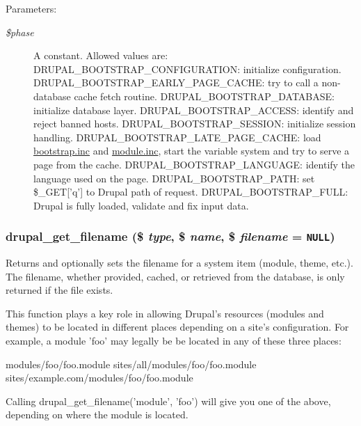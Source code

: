 \begin{Desc}
\item[Parameters:]
\begin{description}
\item[{\em \$phase}]A constant. Allowed values are: DRUPAL\_\-BOOTSTRAP\_\-CONFIGURATION: initialize configuration. DRUPAL\_\-BOOTSTRAP\_\-EARLY\_\-PAGE\_\-CACHE: try to call a non-database cache fetch routine. DRUPAL\_\-BOOTSTRAP\_\-DATABASE: initialize database layer. DRUPAL\_\-BOOTSTRAP\_\-ACCESS: identify and reject banned hosts. DRUPAL\_\-BOOTSTRAP\_\-SESSION: initialize session handling. DRUPAL\_\-BOOTSTRAP\_\-LATE\_\-PAGE\_\-CACHE: load \hyperlink{bootstrap_8inc}{bootstrap.inc} and \hyperlink{module_8inc}{module.inc}, start the variable system and try to serve a page from the cache. DRUPAL\_\-BOOTSTRAP\_\-LANGUAGE: identify the language used on the page. DRUPAL\_\-BOOTSTRAP\_\-PATH: set \$\_\-GET\mbox{[}'q'\mbox{]} to Drupal path of request. DRUPAL\_\-BOOTSTRAP\_\-FULL: Drupal is fully loaded, validate and fix input data. \end{description}
\end{Desc}
\hypertarget{bootstrap_8inc_e2af73b6b16cc9d723e931748aa6c853}{
\subsubsection[{drupal\_\-get\_\-filename}]{\setlength{\rightskip}{0pt plus 5cm}drupal\_\-get\_\-filename (\$ {\em type}, \/  \$ {\em name}, \/  \$ {\em filename} = {\tt NULL})}}
\label{bootstrap_8inc_e2af73b6b16cc9d723e931748aa6c853}


Returns and optionally sets the filename for a system item (module, theme, etc.). The filename, whether provided, cached, or retrieved from the database, is only returned if the file exists.

This function plays a key role in allowing Drupal's resources (modules and themes) to be located in different places depending on a site's configuration. For example, a module 'foo' may legally be be located in any of these three places:

modules/foo/foo.module sites/all/modules/foo/foo.module sites/example.com/modules/foo/foo.module

Calling drupal\_\-get\_\-filename('module', 'foo') will give you one of the above, depending on where the module is located.

